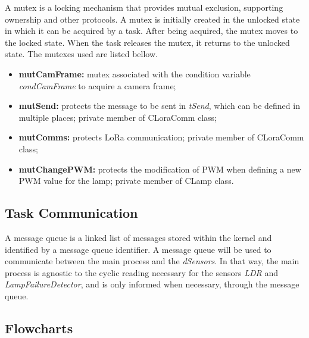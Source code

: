 
A mutex is a locking mechanism that provides mutual exclusion, supporting ownership and other protocols. A mutex is initially created in the unlocked state in which it can be acquired by a task. After being acquired, the mutex moves to the locked state. When the task releases the mutex, it returns to the unlocked state. The mutexes used are listed bellow.

\begin{itemize}
	\item \textbf{mutCamFrame:} mutex associated with the condition variable \textit{condCamFrame} to acquire a camera frame;
		
	\item \textbf{mutSend:} protects the message to be sent in \textit{tSend}, which can be defined in multiple places; private member of CLoraComm class;
	
	\item \textbf{mutComms:} protects LoRa communication; private member of CLoraComm class;
	
	\item \textbf{mutChangePWM:} protects the modification of PWM when defining a new PWM value for the lamp; private member of CLamp class.
	
\end{itemize}

\subsection{Task Communication}

A message queue is a linked list of messages stored within the kernel and identified by a message queue identifier. A message queue will be used to communicate between the main process and the \textit{dSensors}. In that way, the main process is agnostic to the cyclic reading necessary for the sensors \textit{LDR} and \textit{LampFailureDetector}, and is only informed when necessary, through the message queue.

%

\subsection{Flowcharts}
{}

